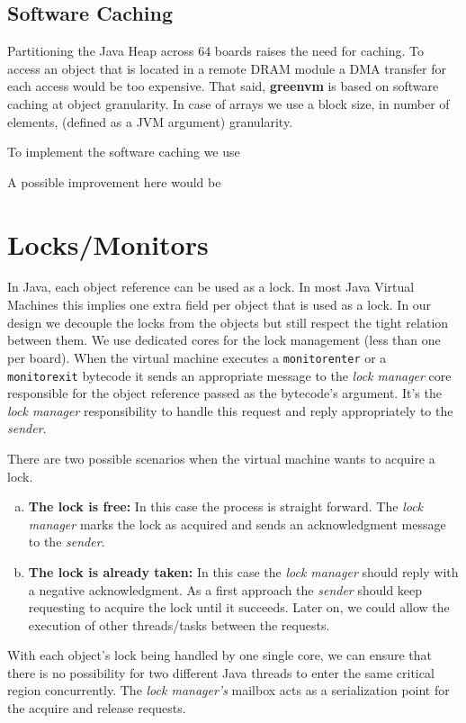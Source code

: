 \documentclass[
a4paper,
12pt,
]{report}
\newcommand{\gvm}{{\fontfamily{fco}\selectfont\textbf{\color{g}green\color{v}vm}}\xspace}
\newcommand{\java}{Java\texttrademark\xspace}
\begin{document}
\subsection{Software Caching}

Partitioning the \java Heap across 64 boards raises the need for
caching. To access an object that is located in a remote DRAM module a
DMA transfer for each access would be too expensive. That said, \gvm
is based on software caching at object granularity. In case of arrays
we use a block size, in number of elements, (defined as a JVM
argument) granularity.

To implement the software caching we use

A possible improvement here would be

\section{Locks/Monitors}

In \java, each object reference can be used as a lock. In most \java
Virtual Machines this implies one extra field per object that is used
as a lock. In our design we decouple the locks from the objects but
still respect the tight relation between them. We use dedicated cores
for the lock management (less than one per board). When the virtual
machine executes a \verb!monitorenter! or a \verb!monitorexit!
bytecode it sends an appropriate message to the \emph{lock manager}
core responsible for the object reference passed as the bytecode's
argument. It's the \emph{lock manager} responsibility to handle this
request and reply appropriately to the \emph{sender}.

There are two possible scenarios when the virtual machine wants to
acquire a lock.
\begin{enumerate}[a)]
\item \textbf{The lock is free:} In this case the process is straight
  forward.  The \emph{lock manager} marks the lock as acquired and
  sends an acknowledgment message to the \emph{sender}.
\item \textbf{The lock is already taken:} In this case the \emph{lock
    manager} should reply with a negative acknowledgment. As a first
  approach the \emph{sender} should keep requesting to acquire the
  lock until it succeeds. Later on, we could allow the execution of
  other threads/tasks between the requests.
\end{enumerate}

With each object's lock being handled by one single core, we can
ensure that there is no possibility for two different \java threads to
enter the same critical region concurrently. The \emph{lock manager's}
mailbox acts as a serialization point for the acquire and release
requests.
\end{document}
